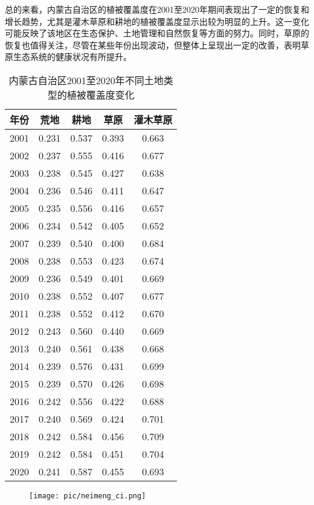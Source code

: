 \documentclass{article}
\begin{document}
		总的来看，内蒙古自治区的植被覆盖度在2001至2020年期间表现出了一定的恢复和增长趋势，尤其是灌木草原和耕地的植被覆盖度显示出较为明显的上升。这一变化可能反映了该地区在生态保护、土地管理和自然恢复等方面的努力。同时，草原的恢复也值得关注，尽管在某些年份出现波动，但整体上呈现出一定的改善，表明草原生态系统的健康状况有所提升。

		\begin{table}[H]
			\centering
			\begin{tabular}{|c|c|c|c|c|}
				\hline
				\textbf{年份} & \textbf{荒地} & \textbf{耕地} & \textbf{草原} & \textbf{灌木草原} \\
				\hline
				2001 & 0.231 & 0.537 & 0.393 & 0.663 \\
				2002 & 0.237 & 0.555 & 0.416 & 0.677 \\
				2003 & 0.238 & 0.545 & 0.427 & 0.638 \\
				2004 & 0.236 & 0.546 & 0.411 & 0.647 \\
				2005 & 0.235 & 0.556 & 0.416 & 0.657 \\
				2006 & 0.234 & 0.542 & 0.405 & 0.652 \\
				2007 & 0.239 & 0.540 & 0.400 & 0.684 \\
				2008 & 0.238 & 0.553 & 0.423 & 0.674 \\
				2009 & 0.236 & 0.549 & 0.401 & 0.669 \\
				2010 & 0.238 & 0.552 & 0.407 & 0.677 \\
				2011 & 0.238 & 0.552 & 0.412 & 0.670 \\
				2012 & 0.243 & 0.560 & 0.440 & 0.669 \\
				2013 & 0.240 & 0.561 & 0.438 & 0.668 \\
				2014 & 0.239 & 0.576 & 0.431 & 0.699 \\
				2015 & 0.239 & 0.570 & 0.426 & 0.698 \\
				2016 & 0.242 & 0.556 & 0.422 & 0.688 \\
				2017 & 0.240 & 0.569 & 0.424 & 0.701 \\
				2018 & 0.242 & 0.584 & 0.456 & 0.709 \\
				2019 & 0.242 & 0.584 & 0.451 & 0.704 \\
				2020 & 0.241 & 0.587 & 0.455 & 0.693 \\
				\hline
			\end{tabular}
			\caption{内蒙古自治区2001至2020年不同土地类型的植被覆盖度变化}
		\end{table}
		
		
			\begin{figure}[H]  %
			\centering
			\texttt{[image: pic/neimeng\_ci.png]} %
		\end{figure}
		
\end{document}
